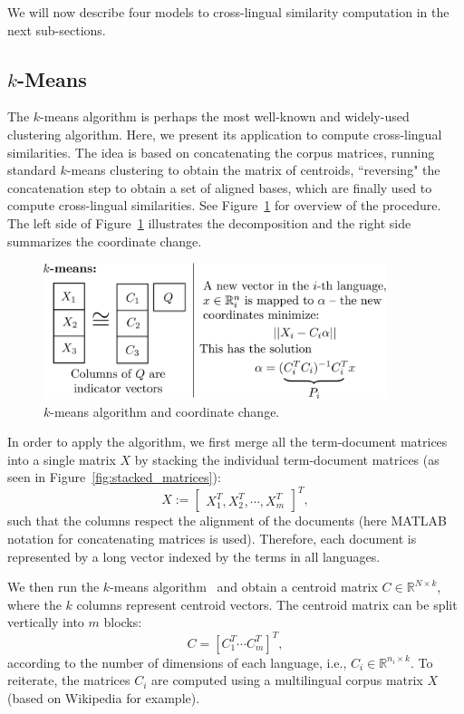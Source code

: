 \documentclass[twoside,11pt]{article}
\newcommand{\RR}{\mathbb{R}}
\begin{document}
We will now describe four models to cross-lingual similarity computation in the next sub-sections.
\subsection{$k$-Means}\label{sec:kmeans}

The $k$-means algorithm is perhaps the most well-known and widely-used clustering algorithm. Here, we present its application
to compute cross-lingual similarities. The idea is based on concatenating the corpus matrices, running standard $k$-means clustering to obtain the matrix of centroids, ``reversing" the concatenation step to obtain a set of aligned bases, which are finally used to compute cross-lingual similarities. See Figure~\ref{fig:kmeans} for overview of the procedure. The left side of Figure~\ref{fig:kmeans} illustrates the decomposition and the right side summarizes the coordinate change.

\begin{figure}[tbp]
\centering
\includegraphics[width=10cm]{kmeans.pdf}
\caption{\label{fig:kmeans} $k$-means algorithm and coordinate change.}
\end{figure}

 In order to apply the algorithm, we first merge all the term-document matrices into a single matrix $X$ by stacking the individual term-document matrices (as seen in Figure~\ref{fig:stacked_matrices}):
$$X := \begin{bmatrix}X_1^T ,X_2^T, \cdots, X_m^T \end{bmatrix}^T,$$
such that the columns respect the alignment of the documents (here MATLAB notation for concatenating matrices is used). Therefore, each document  is represented by a long vector indexed by the terms in all languages.

We then run the $k$-means algorithm~\cite{kmeans} and obtain a centroid matrix $C \in \RR^{N \times k}$, where the $k$ columns represent centroid vectors. The centroid matrix can be split vertically into $m$ blocks: $$C = [C_1^T \cdots C_m^T]^T,$$ according to the number of dimensions of each language, i.e., $C_i \in \RR^{n_i \times k}$.
%
To reiterate, the matrices $C_i$ are computed using a multilingual corpus matrix $X$ (based on Wikipedia for example).
\end{document}

